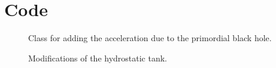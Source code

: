 \documentclass[10pt]{article}
\begin{document}
\lstset{style=mystyle}

\section{Code}

\begin{figure}[htbp]

\caption{Class for adding the acceleration due to the primordial black hole.}
\label{fig:blackholeclass}
\end{figure}

\begin{figure}[htbp]
  
  
  
  
  
  
 \caption{Modifications of the hydrostatic tank.}
\end{figure}
\end{document}
